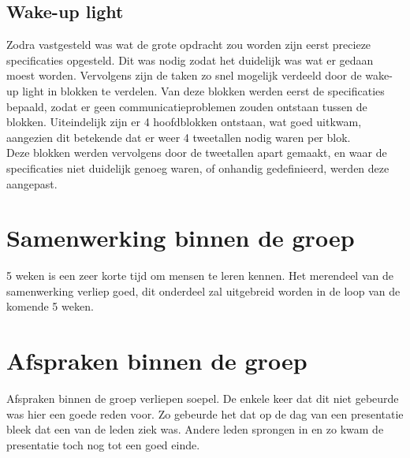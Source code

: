 \subsection{Wake-up light}
Zodra vastgesteld was wat de grote opdracht zou worden zijn eerst precieze specificaties opgesteld. 
Dit was nodig zodat het duidelijk was wat er gedaan moest worden.
Vervolgens zijn de taken zo snel mogelijk verdeeld door de wake-up light in blokken te verdelen. 
Van deze blokken werden eerst de specificaties bepaald, zodat er geen communicatieproblemen zouden ontstaan tussen de blokken.
Uiteindelijk zijn er 4 hoofdblokken ontstaan, wat goed uitkwam, aangezien dit betekende dat er weer 4 tweetallen nodig waren per blok. \\
Deze blokken werden vervolgens door de tweetallen apart gemaakt, en waar de specificaties niet duidelijk genoeg waren, of onhandig gedefinieerd, werden deze aangepast.

\section{Samenwerking binnen de groep}
5 weken is een zeer korte tijd om mensen te leren kennen. Het merendeel van de samenwerking verliep goed, dit onderdeel zal uitgebreid worden in de loop van de komende 5 weken.

\section{Afspraken binnen de groep}
Afspraken binnen de groep verliepen soepel. De enkele keer dat dit niet gebeurde was hier een goede reden voor. Zo gebeurde het dat op de dag van een presentatie bleek dat een van de leden ziek was. Andere leden sprongen in en zo kwam de presentatie toch nog tot een goed einde.